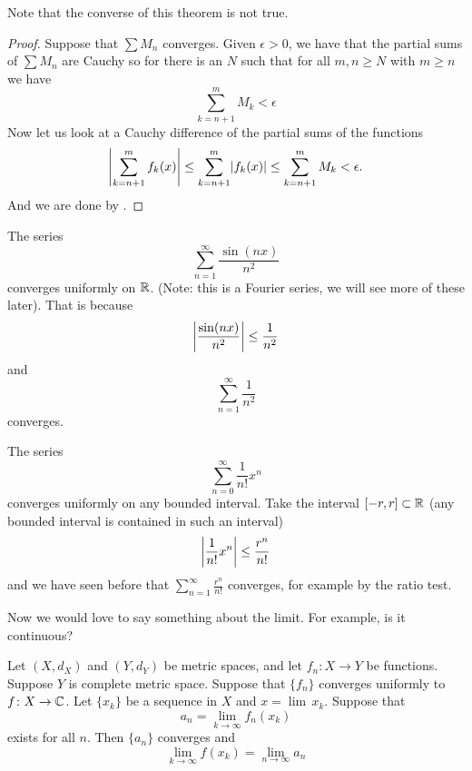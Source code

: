 Note that the converse of this theorem is not true.

\begin{proof}
Suppose that $\sum M_n$ converges.  Given $\epsilon > 0$,
we have that the partial sums of $\sum M_n$ are Cauchy so for
there is an $N$ such that for all $m, n \geq N$ with $m \geq n$ we have
\begin{equation*}
\sum_{k=n+1}^m M_k < \epsilon
\end{equation*}
Now let us look at a Cauchy difference of the partial
sums of the functions
\begin{equation*}
\left\lvert {\sum_{k=n+1}^m f_k(x)} \right\rvert \leq
\sum_{k=n+1}^m \lvert {f_k(x)} \rvert \leq
\sum_{k=n+1}^m M_k < \epsilon .
\end{equation*}
And we are done by .
\end{proof}

\begin{example}
The series
\begin{equation*}
\sum_{n=1}^\infty \frac{\sin(nx)}{n^2}
\end{equation*}
converges uniformly on ${\mathbb{R}}$. (Note: this is a Fourier series,
we will see more of these later).  That is because
\begin{equation*}
\left\lvert {\frac{\sin(nx)}{n^2}} \right\rvert \leq 
\frac{1}{n^2}
\end{equation*}
and
\begin{equation*}
\sum_{n=1}^\infty \frac{1}{n^2}
\end{equation*}
converges.
\end{example}

\begin{example}
The series
\begin{equation*}
\sum_{n=0}^\infty \frac{1}{n!} x^n
\end{equation*}
converges uniformly on any bounded interval.
Take the interval $[-r,r] \subset {\mathbb{R}}$ (any bounded interval
is contained in such an interval)
\begin{equation*}
\left\lvert {\frac{1}{n!} x^n} \right\rvert \leq 
\frac{r^n}{n!}
\end{equation*}
and we have seen before that
$\sum_{n=1}^\infty \frac{r^n}{n!}$ converges, for example by the ratio test.
\end{example}

Now we would love to say something about the limit.  For example, is it
continuous?


\begin{prop} \label{prop:uniformswitch}
Let $(X,d_X)$ and $(Y,d_Y)$ be metric spaces, and let
$f_n \colon X \to Y$ be functions.
Suppose $Y$ is complete metric space.
Suppose that $\{ f_n \}$ converges uniformly to $f \colon X \to {\mathbb{C}}$.  
Let $\{ x_k \}$ be a sequence in $X$ and $x = \lim \, x_k$.  Suppose
that
\begin{equation*}
a_n = \lim_{k \to \infty} f_n(x_k)
\end{equation*}
exists for all $n$.  Then
$\{a_n\}$ converges and 
\begin{equation*}
\lim_{k \to \infty} f(x_k) = \lim_{n\to\infty} a_n
\end{equation*}
\end{prop}

